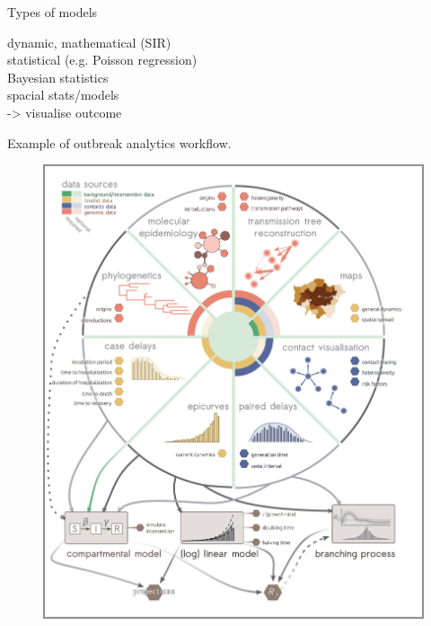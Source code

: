 \documentclass{beamer}\usepackage[]{graphicx}\usepackage[]{color}
\begin{document}
\begin{frame}[fragile]{Types of models}

dynamic, mathematical (SIR) \\
statistical (e.g. Poisson regression) \\
Bayesian statistics \\
spacial stats/models \\

-> visualise outcome

\end{frame}


\begin{frame}[fragile]{Example of outbreak analytics workflow.}
\begin{center}
\begin{figure}
  \centering
  \includegraphics[width=\textwidth,height=0.8\textheight,keepaspectratio]{polonsky2019_Fig2.png}
\end{figure}
\end{center}
\end{frame}
\end{document}
